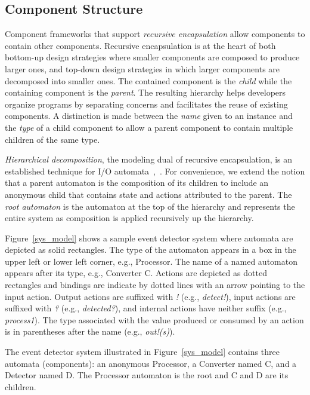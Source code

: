 \subsection{Component Structure\label{component_structure}}

Component frameworks that support \emph{recursive encapsulation} allow components to contain other components.
Recursive encapsulation is at the heart of both bottom-up design strategies where smaller components are composed to produce larger ones, and top-down design strategies in which larger components are decomposed into smaller ones.
The contained component is the \emph{child} while the containing component is the \emph{parent}.
The resulting hierarchy helps developers organize programs by separating concerns and facilitates the reuse of existing components.
A distinction is made between the \emph{name} given to an instance and the \emph{type} of a child component to allow a parent component to contain multiple children of the same type.

\emph{Hierarchical decomposition}, the modeling dual of recursive encapsulation, is an established technique for I/O automata~\cite{lynch1987hierarchical},~\cite{lynch1994atomic}.
For convenience, we extend the notion that a parent automaton is the composition of its children to include an anonymous child that contains state and actions attributed to the parent.
The \emph{root automaton} is the automaton at the top of the hierarchy and represents the entire system as composition is applied recursively up the hierarchy.

Figure~\ref{sys_model} shows a sample event detector system where automata are depicted as solid rectangles.
The type of the automaton appears in a box in the upper left or lower left corner, e.g., Processor.
The name of a named automaton appears after its type, e.g., Converter C.
Actions are depicted as dotted rectangles and bindings are indicate by dotted lines with an arrow pointing to the input action.
Output actions are suffixed with \emph{!} (e.g., \emph{detect!}), input actions are suffixed with \emph{?} (e.g., \emph{detected?}), and internal actions have neither suffix (e.g., \emph{process1}).
The type associated with the value produced or consumed by an action is in parentheses after the name (e.g., \emph{out!(s)}).

The event detector system illustrated in Figure~\ref{sys_model} contains three automata (components):  an anonymous Processor, a Converter named C, and a Detector named D.
The Processor automaton is the root and C and D are its children.

